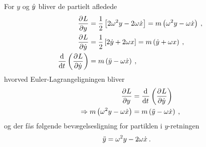 \noindent
For $y$ og $\dt{y}$ bliver de partielt afledede
%
\begin{align}
	\pdif{y}{L} &= \frac{1}{2} \left[ 2 \omega^2y - 2\omega\dt{x} \right] = m \left( \omega^2y - \omega \dt{x} \right) \: , \\
	\pdif{\dt{y}}{L} &= \frac{1}{2} \left[2 \dt{y} + 2 \omega x \right] = m \left( \dt{y} + \omega x \right) \: , \\
	\dif{t}{} \left(\pdif{\dt{y}}{L}\right) &= m \left( \ddt{y} - \omega \dt{x} \right) \: ,
\end{align}
%
hvorved Euler-Lagrangeligningen bliver
%
\begin{align}
	\pdif{y}{L} &= \dif{t}{} \left(\pdif{\dt{y}}{L}\right) \nonumber \\
	\Rightarrow m \left( \omega^2 y-\omega \dt x \right) &= m \left( \ddt{y} - \omega \dt{x} \right) \: ,
\end{align}
%
og der fås følgende bevægelsesligning for partiklen i $y$-retningen
%
\begin{align} \label{eq:yKarusel}
	\ddt{y} &= \omega^2y - 2 \omega \dt{x} \: .
\end{align}

